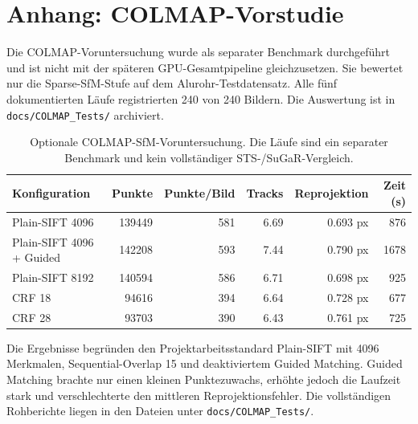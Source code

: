 \section{Anhang: COLMAP-Vorstudie}

Die COLMAP-Voruntersuchung wurde als separater Benchmark durchgeführt und ist
nicht mit der späteren GPU-Gesamtpipeline gleichzusetzen. Sie bewertet nur die
Sparse-SfM-Stufe auf dem Alurohr-Testdatensatz. Alle fünf dokumentierten Läufe
registrierten 240 von 240 Bildern. Die Auswertung ist in
\texttt{docs/COLMAP\_Tests/} archiviert.

\begin{table}[H]
\centering
\small
\begin{tabularx}{\textwidth}{Xrrrrr}
\toprule
Konfiguration & Punkte & Punkte/Bild & Tracks & Reprojektion & Zeit (s)\\
\midrule
Plain-SIFT 4096 & 139449 & 581 & 6.69 & 0.693 px & 876\\
Plain-SIFT 4096 + Guided & 142208 & 593 & 7.44 & 0.790 px & 1678\\
Plain-SIFT 8192 & 140594 & 586 & 6.71 & 0.698 px & 925\\
CRF 18 & 94616 & 394 & 6.64 & 0.728 px & 677\\
CRF 28 & 93703 & 390 & 6.43 & 0.761 px & 725\\
\bottomrule
\end{tabularx}
\caption{Optionale COLMAP-SfM-Voruntersuchung. Die Läufe sind ein separater
Benchmark und kein vollständiger STS-/SuGaR-Vergleich.}
\label{tab:colmap-vorstudie}
\end{table}

Die Ergebnisse begründen den Projektarbeitsstandard Plain-SIFT mit 4096
Merkmalen, Sequential-Overlap 15 und deaktiviertem Guided Matching. Guided
Matching brachte nur einen kleinen Punktezuwachs, erhöhte jedoch die Laufzeit
stark und verschlechterte den mittleren Reprojektionsfehler. Die vollständigen
Rohberichte liegen in den Dateien unter
\texttt{docs/COLMAP\_Tests/}.
